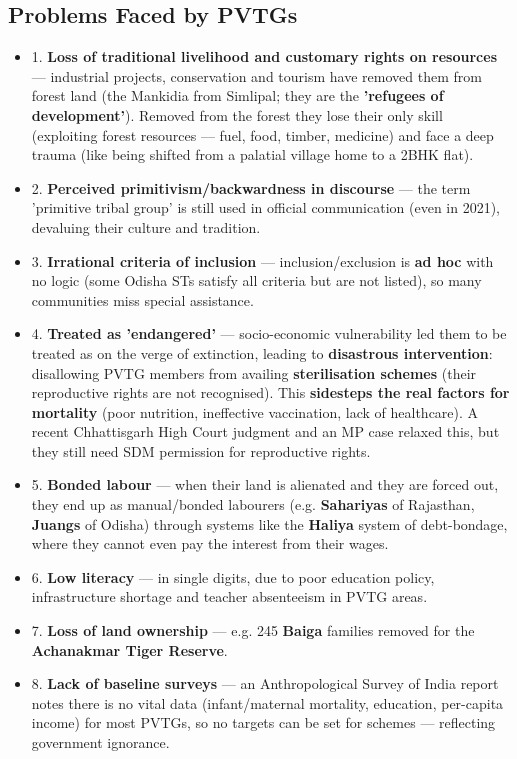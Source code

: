 \subsection{Problems Faced by PVTGs}

\begin{CriticalPoint}
\begin{itemize}
\item 1. \textbf{Loss of traditional livelihood and customary rights on resources} --- industrial projects, conservation and tourism have removed them from forest land (the Mankidia from Simlipal; they are the \textbf{'refugees of development'}). Removed from the forest they lose their only skill (exploiting forest resources --- fuel, food, timber, medicine) and face a deep trauma (like being shifted from a palatial village home to a 2BHK flat).
\item 2. \textbf{Perceived primitivism/backwardness in discourse} --- the term 'primitive tribal group' is still used in official communication (even in 2021), devaluing their culture and tradition.
\item 3. \textbf{Irrational criteria of inclusion} --- inclusion/exclusion is \textbf{ad hoc} with no logic (some Odisha STs satisfy all criteria but are not listed), so many communities miss special assistance.
\item 4. \textbf{Treated as 'endangered'} --- socio-economic vulnerability led them to be treated as on the verge of extinction, leading to \textbf{disastrous intervention}: disallowing PVTG members from availing \textbf{sterilisation schemes} (their reproductive rights are not recognised). This \textbf{sidesteps the real factors for mortality} (poor nutrition, ineffective vaccination, lack of healthcare). A recent Chhattisgarh High Court judgment and an MP case relaxed this, but they still need SDM permission for reproductive rights.
\item 5. \textbf{Bonded labour} --- when their land is alienated and they are forced out, they end up as manual/bonded labourers (e.g. \textbf{Sahariyas} of Rajasthan, \textbf{Juangs} of Odisha) through systems like the \textbf{Haliya} system of debt-bondage, where they cannot even pay the interest from their wages.
\item 6. \textbf{Low literacy} --- in single digits, due to poor education policy, infrastructure shortage and teacher absenteeism in PVTG areas.
\item 7. \textbf{Loss of land ownership} --- e.g. 245 \textbf{Baiga} families removed for the \textbf{Achanakmar Tiger Reserve}.
\item 8. \textbf{Lack of baseline surveys} --- an Anthropological Survey of India report notes there is no vital data (infant/maternal mortality, education, per-capita income) for most PVTGs, so no targets can be set for schemes --- reflecting government ignorance.
\end{itemize}
\end{CriticalPoint}

